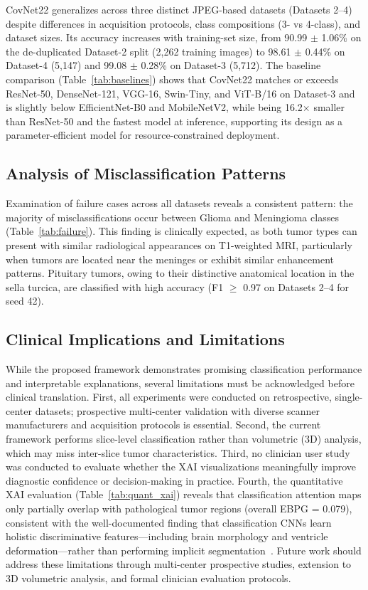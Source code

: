 \documentclass[a4paper,fleqn]{cas-sc}
\begin{document}
CovNet22 generalizes across three distinct JPEG-based datasets (Datasets 2--4) despite differences in acquisition protocols, class compositions (3- vs 4-class), and dataset sizes. Its accuracy increases with training-set size, from 90.99 $\pm$ 1.06\% on the de-duplicated Dataset-2 split (2,262 training images) to 98.61 $\pm$ 0.44\% on Dataset-4 (5,147) and 99.08 $\pm$ 0.28\% on Dataset-3 (5,712). The baseline comparison (Table~\ref{tab:baselines}) shows that CovNet22 matches or exceeds ResNet-50, DenseNet-121, VGG-16, Swin-Tiny, and ViT-B/16 on Dataset-3 and is slightly below EfficientNet-B0 and MobileNetV2, while being 16.2$\times$ smaller than ResNet-50 and the fastest model at inference, supporting its design as a parameter-efficient model for resource-constrained deployment.

\subsection{Analysis of Misclassification Patterns}

Examination of failure cases across all datasets reveals a consistent pattern: the majority of misclassifications occur between Glioma and Meningioma classes (Table~\ref{tab:failure}). This finding is clinically expected, as both tumor types can present with similar radiological appearances on T1-weighted MRI, particularly when tumors are located near the meninges or exhibit similar enhancement patterns. Pituitary tumors, owing to their distinctive anatomical location in the sella turcica, are classified with high accuracy (F1 $\geq$ 0.97 on Datasets 2--4 for seed 42).

\subsection{Clinical Implications and Limitations}

While the proposed framework demonstrates promising classification performance and interpretable explanations, several limitations must be acknowledged before clinical translation. First, all experiments were conducted on retrospective, single-center datasets; prospective multi-center validation with diverse scanner manufacturers and acquisition protocols is essential. Second, the current framework performs slice-level classification rather than volumetric (3D) analysis, which may miss inter-slice tumor characteristics. Third, no clinician user study was conducted to evaluate whether the XAI visualizations meaningfully improve diagnostic confidence or decision-making in practice. Fourth, the quantitative XAI evaluation (Table~\ref{tab:quant_xai}) reveals that classification attention maps only partially overlap with pathological tumor regions (overall EBPG = 0.079), consistent with the well-documented finding that classification CNNs learn holistic discriminative features---including brain morphology and ventricle deformation---rather than performing implicit segmentation~\cite{R_Rudin2019,R_Arun2021}. Future work should address these limitations through multi-center prospective studies, extension to 3D volumetric analysis, and formal clinician evaluation protocols.
\end{document}
